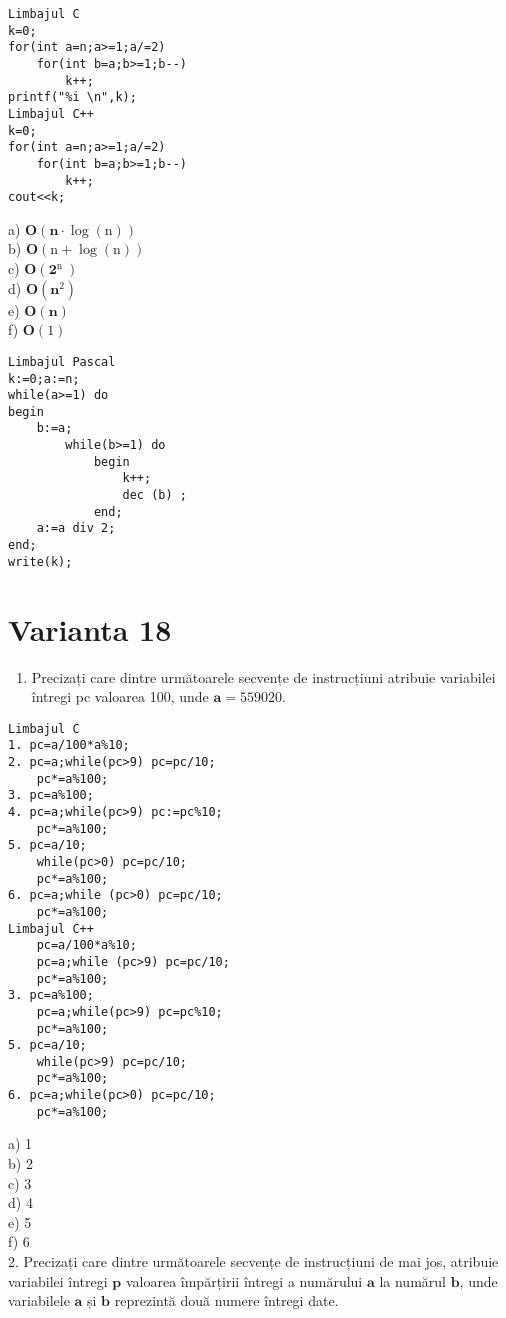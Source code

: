 \begin{verbatim}
Limbajul C
k=0;
for(int a=n;a>=1;a/=2)
    for(int b=a;b>=1;b--)
        k++;
printf("%i \n",k);
Limbajul C++
k=0;
for(int a=n;a>=1;a/=2)
    for(int b=a;b>=1;b--)
        k++;
cout<<k;
\end{verbatim}

a) $\mathbf{O}(\mathbf{n} \cdot \log (\mathrm{n}))$\\
b) $\mathbf{O}(\mathrm{n}+\log (\mathrm{n}))$\\
c) $\mathbf{O}\left(\mathbf{2}^{\text {n }}\right)$\\
d) $\mathbf{O}\left(\mathbf{n}^{2}\right)$\\
e) $\mathbf{O}(\mathbf{n})$\\
f) $\mathbf{O}(1)$

\begin{verbatim}
Limbajul Pascal
k:=0;a:=n;
while(a>=1) do
begin
    b:=a;
        while(b>=1) do
            begin
                k++;
                dec (b) ;
            end;
    a:=a div 2;
end;
write(k);
\end{verbatim}

\section*{Varianta 18}
\begin{enumerate}
  \item Precizați care dintre următoarele secvențe de instrucțiuni atribuie variabilei întregi pc valoarea 100, unde $\mathbf{a}=559020$.
\end{enumerate}

\begin{verbatim}
Limbajul C
1. pc=a/100*a%10;
2. pc=a;while(pc>9) pc=pc/10;
    pc*=a%100;
3. pc=a%100;
4. pc=a;while(pc>9) pc:=pc%10;
    pc*=a%100;
5. pc=a/10;
    while(pc>0) pc=pc/10;
    pc*=a%100;
6. pc=a;while (pc>0) pc=pc/10;
    pc*=a%100;
Limbajul C++
    pc=a/100*a%10;
    pc=a;while (pc>9) pc=pc/10;
    pc*=a%100;
3. pc=a%100;
    pc=a;while(pc>9) pc=pc%10;
    pc*=a%100;
5. pc=a/10;
    while(pc>9) pc=pc/10;
    pc*=a%100;
6. pc=a;while(pc>0) pc=pc/10;
    pc*=a%100;
\end{verbatim}

a) 1\\
b) 2\\
c) 3\\
d) 4\\
e) 5\\
f) 6\\
2. Precizați care dintre următoarele secvențe de instrucțiuni de mai jos, atribuie variabilei întregi $\mathbf{p}$ valoarea împărțirii întregi a numărului $\mathbf{a}$ la numărul $\mathbf{b}$, unde variabilele $\mathbf{a}$ și $\mathbf{b}$ reprezintă două numere întregi date.


